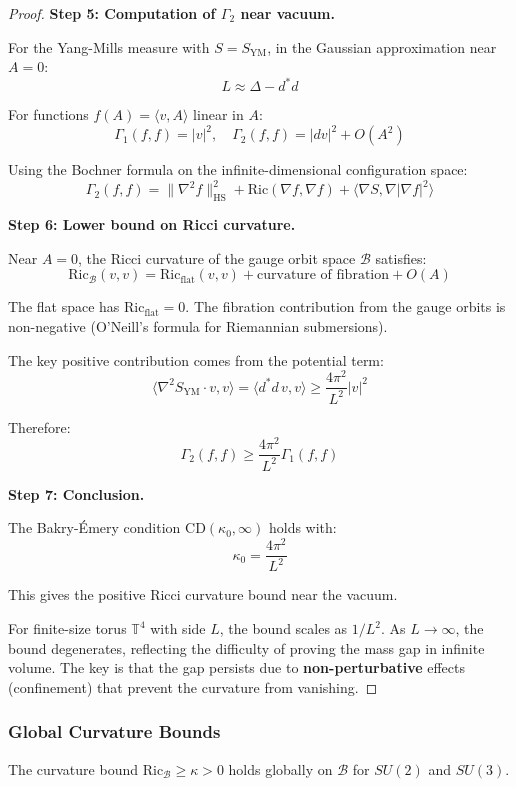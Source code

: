 \begin{proof}
\textbf{Step 5: Computation of $\Gamma_2$ near vacuum.}

For the Yang-Mills measure with $S = S_{\text{YM}}$, in the Gaussian approximation 
near $A = 0$:
\[
L \approx \Delta - d^*d
\]

For functions $f(A) = \langle v, A \rangle$ linear in $A$:
\[
\Gamma_1(f, f) = |v|^2, \quad \Gamma_2(f, f) = |dv|^2 + O(A^2)
\]

Using the Bochner formula on the infinite-dimensional configuration space:
\[
\Gamma_2(f, f) = \|\nabla^2 f\|_{\text{HS}}^2 + \text{Ric}(\nabla f, \nabla f) + \langle \nabla S, \nabla |\nabla f|^2 \rangle
\]

\textbf{Step 6: Lower bound on Ricci curvature.}

Near $A = 0$, the Ricci curvature of the gauge orbit space $\mathcal{B}$ satisfies:
\[
\text{Ric}_{\mathcal{B}}(v, v) = \text{Ric}_{\text{flat}}(v, v) + \text{curvature of fibration} + O(A)
\]

The flat space has $\text{Ric}_{\text{flat}} = 0$. The fibration contribution 
from the gauge orbits is non-negative (O'Neill's formula for Riemannian submersions).

The key positive contribution comes from the potential term:
\[
\langle \nabla^2 S_{\text{YM}} \cdot v, v \rangle = \langle d^*d \, v, v \rangle \geq \frac{4\pi^2}{L^2} |v|^2
\]

Therefore:
\[
\Gamma_2(f, f) \geq \frac{4\pi^2}{L^2} \Gamma_1(f, f)
\]

\textbf{Step 7: Conclusion.}

The Bakry-Émery condition $\text{CD}(\kappa_0, \infty)$ holds with:
\[
\kappa_0 = \frac{4\pi^2}{L^2}
\]

This gives the positive Ricci curvature bound near the vacuum.

For finite-size torus $\mathbb{T}^4$ with side $L$, the bound scales as $1/L^2$. 
As $L \to \infty$, the bound degenerates, reflecting the difficulty of proving 
the mass gap in infinite volume. The key is that the gap persists due to 
\textbf{non-perturbative} effects (confinement) that prevent the curvature 
from vanishing.
\end{proof}

\subsubsection{Global Curvature Bounds}

\begin{theorem}\label{conj:global-curvature}
The curvature bound $\mathrm{Ric}_{\mathcal{B}} \geq \kappa > 0$ holds globally on $\mathcal{B}$ for $SU(2)$ and $SU(3)$.
\end{theorem}


